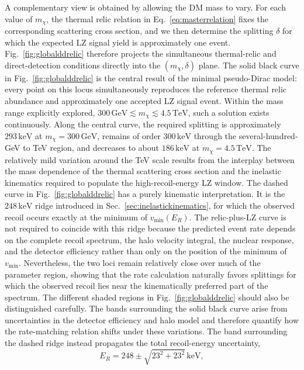 \documentclass[aps,prd,reprint,superscriptaddress,nofootinbib,longbibliography,floatfix]{revtex4-2}
\newcommand{\GeV}{\mathrm{GeV}}
\newcommand{\TeV}{\mathrm{TeV}}
\newcommand{\keV}{\mathrm{keV}}
\begin{document}
A complementary view is obtained by allowing the DM mass to vary. For each value of $m_\chi$, the thermal relic relation in Eq.~\eqref{eq:masterrelation} fixes the corresponding scattering cross section, and we then determine the splitting $\delta$ for which the expected LZ signal yield is approximately one event. Fig.~\ref{fig:globalddrelic} therefore projects the simultaneous thermal-relic and direct-detection conditions directly into the $(m_\chi,\delta)$ plane.
The solid black curve in Fig.~\ref{fig:globalddrelic} is the central result of the minimal pseudo-Dirac model: every point on this locus simultaneously reproduces the reference thermal relic abundance and approximately one accepted LZ signal event. Within the mass range explicitly explored, $300\,\GeV\lesssim m_\chi\lesssim4.5\,\TeV$, such a solution exists continuously. Along the central curve, the required splitting is approximately $293\,\keV$ at $m_\chi=300\,\GeV$, remains of order $300\,\keV$ through the several-hundred-GeV to TeV region, and decreases to about $186\,\keV$ at $m_\chi=4.5\,\TeV$. The relatively mild variation around the TeV scale results from the interplay between the mass dependence of the thermal scattering cross section and the inelastic kinematics required to populate the high-recoil-energy LZ window.
The dashed curve in Fig.~\ref{fig:globalddrelic} has a purely kinematic interpretation. It is the $248\,\keV$ ridge introduced in Sec.~\ref{sec:inelastickinematics}, for which the observed recoil occurs exactly at the minimum of $v_{\min}(E_R)$. The relic-plus-LZ curve is not required to coincide with this ridge because the predicted event rate depends on the complete recoil spectrum, the halo velocity integral, the nuclear response, and the detector efficiency rather than only on the position of the minimum of $v_{\min}$. Nevertheless, the two loci remain relatively close over much of the parameter region, showing that the rate calculation naturally favors splittings for which the observed recoil lies near the kinematically preferred part of the spectrum.
The different shaded regions in Fig.~\ref{fig:globalddrelic} should also be distinguished carefully. The bands surrounding the solid black curve arise from uncertainties in the detector efficiency and halo model and therefore quantify how the rate-matching relation shifts under these variations. The band surrounding the dashed ridge instead propagates the total recoil-energy uncertainty,
\begin{equation}
E_R=248\pm\sqrt{23^2+23^2}\,\keV,
\end{equation}
\end{document}
